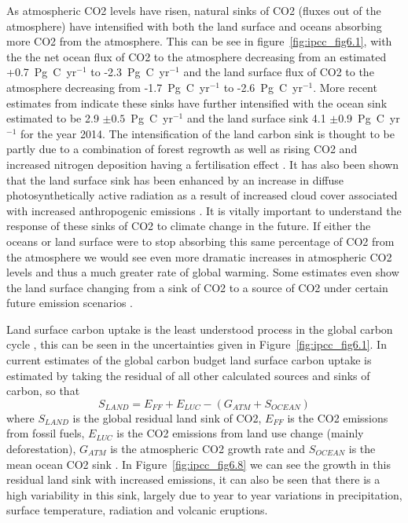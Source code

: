 \documentclass[11pt]{article}
\begin{document}
As atmospheric CO2 levels have risen, natural sinks of CO2 (fluxes out of the atmosphere) have intensified with both the land surface and oceans absorbing more CO2 from the atmosphere. This can be see in figure~\ref{fig:ipcc_fig6.1}, with the the net ocean flux of CO2 to the atmosphere decreasing from an estimated +0.7~Pg~C~yr\(^{-1}\) to -2.3~Pg~C~yr\(^{-1}\) and the land surface flux of CO2 to the atmosphere decreasing from -1.7~Pg~C~yr\(^{-1}\) to -2.6~Pg~C~yr\(^{-1}\). More recent estimates from \citet{le2015global} indicate these sinks have further intensified with the ocean sink estimated to be 2.9 \(\pm 0.5\)~Pg~C~yr\(^{-1}\) and the land surface sink 4.1 \(\pm 0.9\)~Pg~C~yr\(^{-1}\) for the year 2014. The intensification of the land carbon sink is thought to be partly due to a combination of forest regrowth as well as rising CO2 and increased nitrogen deposition having a fertilisation effect \citep{ciais2014carbon}. It has also been shown that the land surface sink has been enhanced by an increase in diffuse photosynthetically active radiation as a result of increased cloud cover associated with increased anthropogenic emissions \citep{Mercadodiffuseradiation2009}. It is vitally important to understand the response of these sinks of CO2 to climate change in the future. If either the oceans or land surface were to stop absorbing this same percentage of CO2 from the atmosphere we would see even more dramatic increases in atmospheric CO2 levels and thus a much greater rate of global warming. Some estimates even show the land surface changing from a sink of CO2 to a source of CO2 under certain future emission scenarios \citep{sitch2008evaluation}.

Land surface carbon uptake is the least understood process in the global carbon cycle \citep{ciais2014carbon}, this can be seen in the uncertainties given in Figure~\ref{fig:ipcc_fig6.1}. In current estimates of the global carbon budget land surface carbon uptake is estimated by taking the residual of all other calculated sources and sinks of carbon, so that
\begin{equation}
S_{LAND} = E_{FF} + E_{LUC} - (G_{ATM} + S_{OCEAN})
\end{equation}  
where \(S_{LAND}\) is the global residual land sink of CO2, \(E_{FF}\) is the CO2 emissions from fossil fuels, \(E_{LUC}\) is the CO2 emissions from land use change (mainly deforestation), \(G_{ATM}\) is the atmospheric CO2 growth rate and \(S_{OCEAN}\) is the mean ocean CO2 sink \citep{le2015global}. In Figure~\ref{fig:ipcc_fig6.8} we can see the growth in this residual land sink with increased emissions, it can also be seen that there is a high variability in this sink, largely due to year to year variations in precipitation, surface temperature, radiation and volcanic eruptions.
\end{document}
